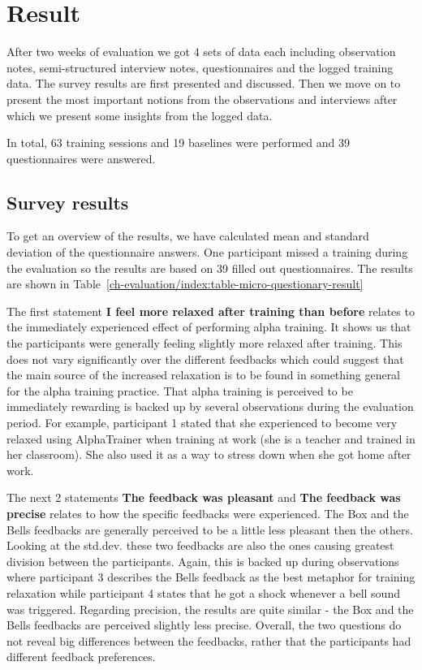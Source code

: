 \documentclass[a4paper,10pt,english,lof,lot,twoside]{puthesis}
\begin{document}
\section{Result}
\label{ch-evaluation/index:result}
After two weeks of evaluation we got 4 sets of data each including observation notes, semi-structured interview notes, questionnaires and the logged training data. The survey results are first presented and discussed. Then we move on to present the most important notions from the observations and interviews after which we present some insights from the logged data.

In total, 63 training sessions and 19 baselines were performed and 39 questionnaires were answered.


\subsection{Survey results}
\label{ch-evaluation/index:survey-results}
To get an overview of the results, we have calculated mean and standard deviation of the questionnaire answers. One participant missed a training during the evaluation so the results are based on 39 filled out questionnaires. The results are shown in Table \ref{ch-evaluation/index:table-micro-questionary-result}

The first statement \textbf{I feel more relaxed after training than before} relates to the immediately experienced effect of performing alpha training. It shows us that the participants were generally feeling slightly more relaxed after training. This does not vary significantly over the different feedbacks which could suggest that the main source of the increased relaxation is to be found in something general for the alpha training practice. That alpha training is perceived to be immediately rewarding is backed up by several observations during the evaluation period. For example, participant 1 stated that she experienced to become very relaxed using AlphaTrainer when training at work (she is a teacher and trained in her classroom). She also used it as a way to stress down when she got home after work.

The next 2 statements \textbf{The feedback was pleasant} and \textbf{The feedback was precise} relates to how the specific feedbacks were experienced. The Box and the Bells feedbacks are generally perceived to be a little less pleasant then the others. Looking at the std.dev. these two feedbacks are also the ones causing greatest division between the participants. Again, this is backed up during observations where participant 3 describes the Bells feedback as the best metaphor for training relaxation while participant 4 states that he got a shock whenever a bell sound was triggered. Regarding precision, the results are quite similar - the Box and the Bells feedbacks are perceived slightly less precise. Overall, the two questions do not reveal big differences between the feedbacks, rather that the participants had different feedback preferences.
\end{document}
